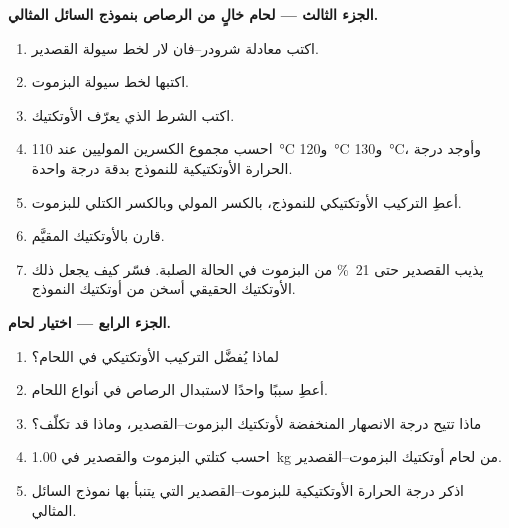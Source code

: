 \begin{problem}
\medskip
\noindent\textbf{الجزء الثالث --- لحام خالٍ من الرصاص بنموذج السائل المثالي.}
\begin{enumerate}[resume]
  \item اكتب معادلة شرودر--فان لار لخط سيولة القصدير.
  \item اكتبها لخط سيولة البزموت.
  \item اكتب الشرط الذي يعرّف الأوتكتيك.
  \item احسب مجموع الكسرين الموليين عند \qty{110}{\degreeCelsius}
        و\qty{120}{\degreeCelsius} و\qty{130}{\degreeCelsius}، وأوجد
        درجة الحرارة الأوتكتيكية للنموذج بدقة درجة واحدة.
  \item أعطِ التركيب الأوتكتيكي للنموذج، بالكسر المولي وبالكسر
        الكتلي للبزموت.
  \item قارن بالأوتكتيك المقيَّم.
  \item يذيب القصدير حتى 21~\% من البزموت في الحالة الصلبة. فسّر كيف يجعل
        ذلك الأوتكتيك الحقيقي أسخن من أوتكتيك النموذج.
\end{enumerate}

\medskip
\noindent\textbf{الجزء الرابع --- اختيار لحام.}
\begin{enumerate}[resume]
  \item لماذا يُفضَّل التركيب الأوتكتيكي في اللحام؟
  \item أعطِ سببًا واحدًا لاستبدال الرصاص في أنواع اللحام.
  \item ماذا تتيح درجة الانصهار المنخفضة لأوتكتيك البزموت--القصدير، وماذا
        قد تكلّف؟
  \item احسب كتلتي البزموت والقصدير في \qty{1.00}{kg} من لحام
        أوتكتيك البزموت--القصدير.
  \item اذكر درجة الحرارة الأوتكتيكية للبزموت--القصدير التي يتنبأ بها
        نموذج السائل المثالي.
\end{enumerate}
\end{problem}
